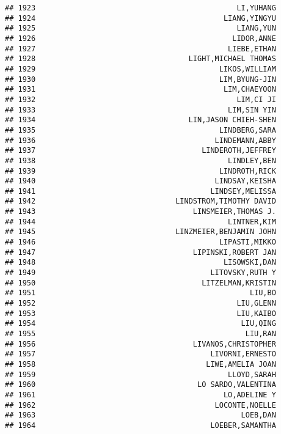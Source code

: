 \documentclass[
]{article}
\begin{document}
\begin{verbatim}
## 1923                                              LI,YUHANG
## 1924                                           LIANG,YINGYU
## 1925                                              LIANG,YUN
## 1926                                             LIDOR,ANNE
## 1927                                            LIEBE,ETHAN
## 1928                                   LIGHT,MICHAEL THOMAS
## 1929                                          LIKOS,WILLIAM
## 1930                                          LIM,BYUNG-JIN
## 1931                                           LIM,CHAEYOON
## 1932                                              LIM,CI JI
## 1933                                            LIM,SIN YIN
## 1934                                   LIN,JASON CHIEH-SHEN
## 1935                                          LINDBERG,SARA
## 1936                                         LINDEMANN,ABBY
## 1937                                      LINDEROTH,JEFFREY
## 1938                                            LINDLEY,BEN
## 1939                                          LINDROTH,RICK
## 1940                                         LINDSAY,KEISHA
## 1941                                        LINDSEY,MELISSA
## 1942                                LINDSTROM,TIMOTHY DAVID
## 1943                                    LINSMEIER,THOMAS J.
## 1944                                            LINTNER,KIM
## 1945                                LINZMEIER,BENJAMIN JOHN
## 1946                                          LIPASTI,MIKKO
## 1947                                    LIPINSKI,ROBERT JAN
## 1948                                           LISOWSKI,DAN
## 1949                                        LITOVSKY,RUTH Y
## 1950                                      LITZELMAN,KRISTIN
## 1951                                                 LIU,BO
## 1952                                              LIU,GLENN
## 1953                                              LIU,KAIBO
## 1954                                               LIU,QING
## 1955                                                LIU,RAN
## 1956                                    LIVANOS,CHRISTOPHER
## 1957                                        LIVORNI,ERNESTO
## 1958                                       LIWE,AMELIA JOAN
## 1959                                            LLOYD,SARAH
## 1960                                     LO SARDO,VALENTINA
## 1961                                           LO,ADELINE Y
## 1962                                         LOCONTE,NOELLE
## 1963                                               LOEB,DAN
## 1964                                        LOEBER,SAMANTHA

\end{verbatim}
\end{document}
